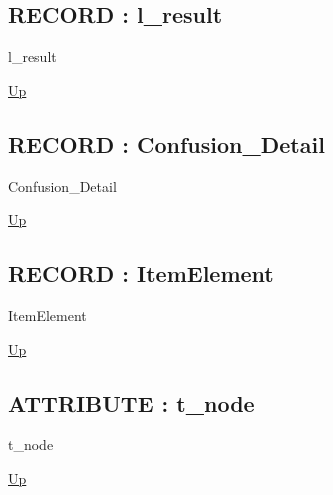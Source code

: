 \par
\par
\subsection*{RECORD : l\_result}
\hypertarget{ecldoc:ml_core.types.l_result}{}
\begin{minipage}[t]{\textwidth}
\begin{flushleft}
 l\_result 
\end{flushleft}
\end{minipage}
\hyperlink{ecldoc:ML_Core.Types}{Up}

\par
\par
\subsection*{RECORD : Confusion\_Detail}
\hypertarget{ecldoc:ml_core.types.confusion_detail}{}
\begin{minipage}[t]{\textwidth}
\begin{flushleft}
 Confusion\_Detail 
\end{flushleft}
\end{minipage}
\hyperlink{ecldoc:ML_Core.Types}{Up}

\par
\par
\subsection*{RECORD : ItemElement}
\hypertarget{ecldoc:ml_core.types.itemelement}{}
\begin{minipage}[t]{\textwidth}
\begin{flushleft}
 ItemElement 
\end{flushleft}
\end{minipage}
\hyperlink{ecldoc:ML_Core.Types}{Up}

\par
\par
\subsection*{ATTRIBUTE : t\_node}
\hypertarget{ecldoc:ml_core.types.t_node}{}
\begin{minipage}[t]{\textwidth}
\begin{flushleft}
 t\_node 
\end{flushleft}
\end{minipage}
\hyperlink{ecldoc:ML_Core.Types}{Up}

